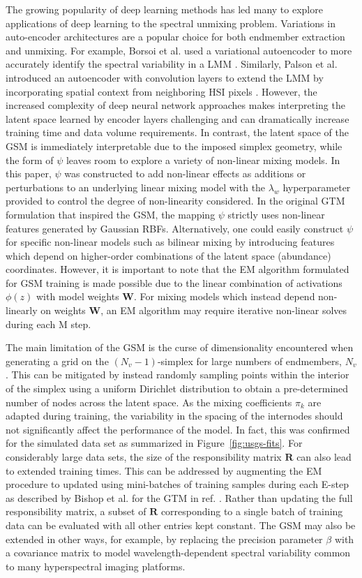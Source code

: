 \documentclass[remotesensing,article,submit,pdftex,moreauthors]{Definitions/mdpi}
\begin{document}
The growing popularity of deep learning methods has led many to explore applications of deep learning to the spectral unmixing problem. Variations in auto-encoder architectures are a popular choice for both endmember extraction and unmixing. For example, Borsoi et al. used a variational autoencoder to more accurately identify the spectral variability in a LMM \cite{borsoi2019deep}. Similarly, Palson et al. introduced an autoencoder with convolution layers to extend the LMM by incorporating spatial context from neighboring HSI pixels \cite{palsson2020convolutional}. However, the increased complexity of deep neural network approaches makes interpreting the latent space learned by encoder layers challenging and can dramatically increase training time and data volume requirements. In contrast, the latent space of the GSM is immediately interpretable due to the imposed simplex geometry, while the form of $\psi$ leaves room to explore a variety of non-linear mixing models. In this paper, $\psi$ was constructed to add non-linear effects as additions or perturbations to an underlying linear mixing model with the $\lambda_w$ hyperparameter provided to control the degree of non-linearity considered. In the original GTM formulation that inspired the GSM, the mapping $\psi$ strictly uses non-linear features generated by Gaussian RBFs. Alternatively, one could easily construct $\psi$ for specific non-linear models such as bilinear mixing by introducing features which depend on higher-order combinations of the latent space (abundance) coordinates. However, it is important to note that the EM algorithm formulated for GSM training is made possible due to the linear combination of activations $\phi(z)$ with model weights $\mathbf{W}$. For mixing models which instead depend non-linearly on weights $\mathbf{W}$, an EM algorithm may require iterative non-linear solves during each M step.

The main limitation of the GSM is the curse of dimensionality encountered when generating a grid on the $(N_v-1)$-simplex for large numbers of endmembers, $N_v$. This can be mitigated by instead randomly sampling points within the interior of the simplex using a uniform Dirichlet distribution to obtain a pre-determined number of nodes across the latent space. As the mixing coefficients $\pi_k$ are adapted during training, the variability in the spacing of the internodes should not significantly affect the performance of the model. In fact, this was confirmed for the simulated data set as summarized in Figure~\ref{fig:usgs-fits}. For considerably large data sets, the size of the responsibility matrix $\mathbf{R}$ can also lead to extended training times. This can be addressed by augmenting the EM procedure to updated using mini-batches of training samples during each E-step as described by Bishop et al. for the GTM in ref. \cite{gtm-developments}. Rather than updating the full responsibility matrix, a subset of $\mathbf{R}$ corresponding to a single batch of training data can be evaluated with all other entries kept constant. The GSM may also be extended in other ways, for example, by replacing the precision parameter $\beta$ with a covariance matrix to model wavelength-dependent spectral variability common to many hyperspectral imaging platforms. 
\end{document}
